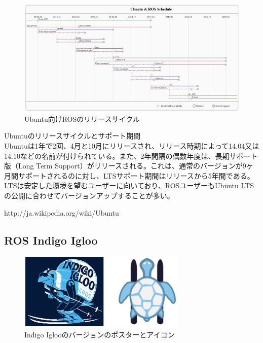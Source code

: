 \begin{figure}[h]
  \centering
  \includegraphics[width=\columnwidth]{pictures/chapter1/pic_01_07.png}
  \caption{Ubuntu向けROSのリリースサイクル}
\end{figure}

\newline
Ubuntuのリリースサイクルとサポート期間\\

Ubuntuは1年で2回、4月と10月にリリースされ、リリース時期によって14.04又は14.10などの名前が付けられている。また、2年間隔の偶数年度は、長期サポート版（Long Term Support）がリリースされる。これは、通常のバージョンが9ヶ月間サポートされるのに対し、LTSサポート期間はリリースから5年間である。LTSは安定した環境を望むユーザーに向いており、ROSユーザーもUbuntu LTSの公開に合わせてバージョンアップすることが多い。

http://ja.wikipedia.org/wiki/Ubuntu

\subsection{ROS Indigo Igloo}

\begin{figure}[h]
  \centering
  \includegraphics[width=8cm]{pictures/chapter1/pic_01_08.png}
  \caption{Indigo Iglooのバージョンのポスターとアイコン}
\end{figure}

